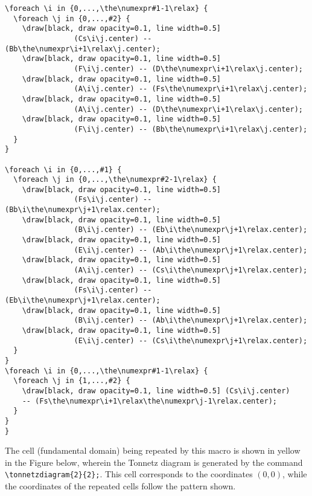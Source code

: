 \documentclass[10pt]{article}
\newcommand{\tonnetzdiagram}[2] {
	\foreach \i in {0,...,#1}
		\foreach \j in {0,...,#2} {
			\node[] (Fs\i\j) at (0-1.5*\j+3.5*\i,0+\j*2.598+\i*0.866) {$F_\sharp$};
			\node[] (B\i\j) at (1-1.5*\j+3.5*\i,0+\j*2.598+\i*0.866) {$B$};
			\node[] (E\i\j) at (2-1.5*\j+3.5*\i,0+\j*2.598+\i*0.866) {$E$};
			\node[] (A\i\j) at (3-1.5*\j+3.5*\i,0+\j*2.598+\i*0.866) {$A$};
			
			\draw[black, draw opacity=0.1, line width=0.5] (Fs\i\j.center) -- (B\i\j.center) -- (E\i\j.center) -- (A\i\j.center);
			
			\node[] (D\i\j) at (0.5-1.5*\j+3.5*\i,-0.866+\j*2.598+\i*0.866) {$D$};
			\node[] (G\i\j) at (1.5-1.5*\j+3.5*\i,-0.866+\j*2.598+\i*0.866) {$G$};
			\node[] (C\i\j) at (2.5-1.5*\j+3.5*\i,-0.866+\j*2.598+\i*0.866) {$C$};
			\node[] (F\i\j) at (3.5-1.5*\j+3.5*\i,-0.866+\j*2.598+\i*0.866) {$F$};
			
			\draw[black, draw opacity=0.1, line width=0.5] (D\i\j.center) -- (G\i\j.center) -- (C\i\j.center) -- (F\i\j.center);
			
			\node[] (Bb\i\j) at (1-1.5*\j+3.5*\i,-2*0.866+\j*2.598+\i*0.866) {$B_\flat$};
			\node[] (Eb\i\j) at (2-1.5*\j+3.5*\i,-2*0.866+\j*2.598+\i*0.866) {$E_\flat$};
			\node[] (Ab\i\j) at (3-1.5*\j+3.5*\i,-2*0.866+\j*2.598+\i*0.866) {$A_\flat$};
			\node[] (Cs\i\j) at (4-1.5*\j+3.5*\i,-2*0.866+\j*2.598+\i*0.866) {$C_\sharp$};
			
			\draw[black, draw opacity=0.1, line width=0.5] (Bb\i\j.center) -- (Eb\i\j.center) -- (Ab\i\j.center) -- (Cs\i\j.center);
			
			\draw[black, draw opacity=0.1, line width=0.5] (Fs\i\j.center) -- (D\i\j.center) -- (Bb\i\j.center);
			\draw[black, draw opacity=0.1, line width=0.5] (B\i\j.center) -- (G\i\j.center) -- (Eb\i\j.center);
			\draw[black, draw opacity=0.1, line width=0.5] (E\i\j.center) -- (C\i\j.center) -- (Ab\i\j.center);
			\draw[black, draw opacity=0.1, line width=0.5] (A\i\j.center) -- (F\i\j.center) -- (Cs\i\j.center);
			
			\draw[black, draw opacity=0.1, line width=0.5] (D\i\j.center) -- (B\i\j.center);
			\draw[black, draw opacity=0.1, line width=0.5] (Bb\i\j.center) -- (G\i\j.center) -- (E\i\j.center);
			\draw[black, draw opacity=0.1, line width=0.5] (Eb\i\j.center) -- (C\i\j.center) -- (A\i\j.center);
			\draw[black, draw opacity=0.1, line width=0.5] (Ab\i\j.center) -- (F\i\j.center);
			
			
	}
	
	\foreach \i in {0,...,\the\numexpr#1-1\relax} {
	    \foreach \j in {0,...,#2} {
	         \draw[black, draw opacity=0.1, line width=0.5] (Cs\i\j.center) -- (Bb\the\numexpr\i+1\relax\j.center);
	         \draw[black, draw opacity=0.1, line width=0.5] (F\i\j.center) -- (D\the\numexpr\i+1\relax\j.center);
	         \draw[black, draw opacity=0.1, line width=0.5] (A\i\j.center) -- (Fs\the\numexpr\i+1\relax\j.center);
	         
	         \draw[black, draw opacity=0.1, line width=0.5] (A\i\j.center) -- (D\the\numexpr\i+1\relax\j.center);
	         \draw[black, draw opacity=0.1, line width=0.5] (F\i\j.center) -- (Bb\the\numexpr\i+1\relax\j.center);
	     }
	 }
	 
	 \foreach \i in {0,...,#1} {
	 \foreach \j in {0,...,\the\numexpr#2-1\relax} {
	 	\draw[black, draw opacity=0.1, line width=0.5] (Fs\i\j.center) -- (Bb\i\the\numexpr\j+1\relax.center);
	         \draw[black, draw opacity=0.1, line width=0.5] (B\i\j.center) -- (Eb\i\the\numexpr\j+1\relax.center);
	         \draw[black, draw opacity=0.1, line width=0.5] (E\i\j.center) -- (Ab\i\the\numexpr\j+1\relax.center);
	         \draw[black, draw opacity=0.1, line width=0.5] (A\i\j.center) -- (Cs\i\the\numexpr\j+1\relax.center);
	 	\draw[black, draw opacity=0.1, line width=0.5] (Fs\i\j.center) -- (Eb\i\the\numexpr\j+1\relax.center);
		\draw[black, draw opacity=0.1, line width=0.5] (B\i\j.center) -- (Ab\i\the\numexpr\j+1\relax.center);
		\draw[black, draw opacity=0.1, line width=0.5] (E\i\j.center) -- (Cs\i\the\numexpr\j+1\relax.center);
	  }}
	 \foreach \i in {0,...,\the\numexpr#1-1\relax} {
	 \foreach \j in {1,...,#2} {
	 	\draw[black, draw opacity=0.1, line width=0.5] (Cs\i\j.center) -- (Fs\the\numexpr\i+1\relax\the\numexpr\j-1\relax.center);
	  }}
}
\begin{document}
\begin{verbatim}
\foreach \i in {0,...,\the\numexpr#1-1\relax} {
  \foreach \j in {0,...,#2} {
    \draw[black, draw opacity=0.1, line width=0.5]
                (Cs\i\j.center) -- (Bb\the\numexpr\i+1\relax\j.center);
    \draw[black, draw opacity=0.1, line width=0.5]
                (F\i\j.center) -- (D\the\numexpr\i+1\relax\j.center);
    \draw[black, draw opacity=0.1, line width=0.5]
                (A\i\j.center) -- (Fs\the\numexpr\i+1\relax\j.center);
    \draw[black, draw opacity=0.1, line width=0.5]
                (A\i\j.center) -- (D\the\numexpr\i+1\relax\j.center);
    \draw[black, draw opacity=0.1, line width=0.5]
                (F\i\j.center) -- (Bb\the\numexpr\i+1\relax\j.center);
  }
}
	 
\foreach \i in {0,...,#1} {
  \foreach \j in {0,...,\the\numexpr#2-1\relax} {
    \draw[black, draw opacity=0.1, line width=0.5]
                (Fs\i\j.center) -- (Bb\i\the\numexpr\j+1\relax.center);
    \draw[black, draw opacity=0.1, line width=0.5]
                (B\i\j.center) -- (Eb\i\the\numexpr\j+1\relax.center);
    \draw[black, draw opacity=0.1, line width=0.5]
                (E\i\j.center) -- (Ab\i\the\numexpr\j+1\relax.center);
    \draw[black, draw opacity=0.1, line width=0.5]
                (A\i\j.center) -- (Cs\i\the\numexpr\j+1\relax.center);
    \draw[black, draw opacity=0.1, line width=0.5]
                (Fs\i\j.center) -- (Eb\i\the\numexpr\j+1\relax.center);
    \draw[black, draw opacity=0.1, line width=0.5]
                (B\i\j.center) -- (Ab\i\the\numexpr\j+1\relax.center);
    \draw[black, draw opacity=0.1, line width=0.5]
                (E\i\j.center) -- (Cs\i\the\numexpr\j+1\relax.center);
  }
}
\foreach \i in {0,...,\the\numexpr#1-1\relax} {
  \foreach \j in {1,...,#2} {
    \draw[black, draw opacity=0.1, line width=0.5] (Cs\i\j.center) 
    -- (Fs\the\numexpr\i+1\relax\the\numexpr\j-1\relax.center);
  }
}
}
\end{verbatim}

The cell (fundamental domain) being repeated by this macro is shown in yellow in the Figure below, wherein the Tonnetz diagram is generated by the command \verb|\tonnetzdiagram{2}{2};|. This cell corresponds to the coordinates $(0,0)$, while the coordinates of the repeated cells follow the pattern shown.
\end{document}
